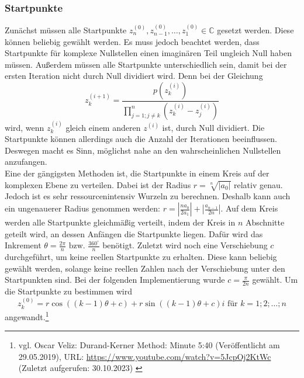 \documentclass[12pt]{article}
\begin{document}
\subsubsection{Startpunkte}
Zunächst müssen alle Startpunkte $z_n^{(0)},z_{n-1}^{(0)},\dots,z_1^{(0)} \in \mathbb{C}$ gesetzt werden. Diese können beliebig gewählt werden. Es muss jedoch beachtet werden, dass Startpunkte für komplexe Nullstellen einen imaginären Teil ungleich Null haben müssen. Außerdem müssen alle Startpunkte unterschiedlich sein, damit bei der ersten Iteration nicht durch Null dividiert wird. Denn bei der Gleichung
\begin{equation*}
    z_k^{(i+1)} = \frac{p(z_{k}^{(i)})}{\prod_{j=1;j\neq k}^{n}(z_{k}^{(i)}-z_j^{(i)})}
\end{equation*}
wird, wenn $z_{k}^{(i)}$ gleich einem anderen $z^{(i)}$ ist, durch Null dividiert.
Die Startpunkte können allerdings auch die Anzahl der Iterationen beeinflussen. Deswegen macht es Sinn, möglichst nahe an den wahrscheinlichen Nullstellen anzufangen.\\
Eine der gängigsten Methoden ist, die Startpunkte in einem Kreis auf der komplexen Ebene zu verteilen. Dabei ist der Radius $r = \sqrt[n]{|a_0|}$ relativ genau. Jedoch ist es sehr ressourcenintensiv Wurzeln zu berechnen. Deshalb kann auch ein ungenauerer Radius genommen werden: $r = |\frac{na_0}{2a_1}| + |\frac{a_{n-1}}{2n}|$.
Auf dem Kreis werden alle Startpunkte gleichmäßig verteilt, indem der Kreis in $n$ Abschnitte geteilt wird, an dessen Anfängen die Startpunkte liegen. Dafür wird das Inkrement $\theta = \frac{2\pi}{n} \text{ bzw. } \frac{360^\circ}{n}$ benötigt. Zuletzt wird noch eine Verschiebung $c$ durchgeführt, um keine reellen Startpunkte zu erhalten. Diese kann beliebig gewählt werden, solange keine reellen Zahlen nach der Verschiebung unter den Startpunkten sind. Bei der folgenden Implementierung wurde $c = \frac{\pi}{2n}$ gewählt.
Um die Startpunkte zu bestimmen wird 
\[z_{k}^{(0)} = r\cos((k-1)\theta+c)+r\sin((k-1)\theta+c)i \text{ für } k=1;2;\dots;n\]
angewandt.\footnote{
    vgl. Oscar Veliz: Durand-Kerner Method: Minute 5:40 (Veröffentlicht am 29.05.2019), URL: \url{https://www.youtube.com/watch?v=5JcpOj2KtWc} (Zuletzt aufgerufen: 30.10.2023) \label{ftn:OscarVilez,5:40}
}
\end{document}
